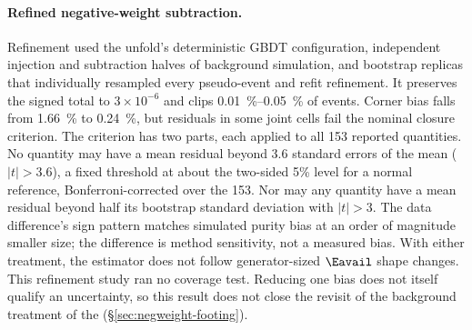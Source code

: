 \paragraph{Refined negative-weight subtraction.} Refinement used the unfold's deterministic GBDT configuration, independent injection and subtraction halves of background simulation, and bootstrap replicas that individually resampled every pseudo-event and refit refinement. It preserves the signed total to $3\times10^{-6}$ and clips \SIrange{0.01}{0.05}{\percent} of events. Corner bias falls from \SI{1.66}{\percent} to \SI{0.24}{\percent}, but residuals in some joint cells fail the nominal closure criterion. The criterion has two parts, each applied to all 153 reported quantities. No quantity may have a mean residual beyond 3.6 standard errors of the mean ($|t|>3.6$), a fixed threshold at about the two-sided 5\% level for a normal reference, Bonferroni-corrected over the 153. Nor may any quantity have a mean residual beyond half its bootstrap standard deviation with $|t|>3$. The data difference's sign pattern matches simulated purity bias at an order of magnitude smaller size; the difference is method sensitivity, not a measured bias. With either treatment, the estimator does not follow generator-sized $\Eavail$ shape changes. This refinement study ran no coverage test. Reducing one bias does not itself qualify an uncertainty, so this result does not close the revisit of the background treatment of the \resFiveAxis{} (\S\ref{sec:negweight-footing}).
